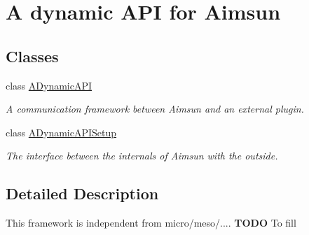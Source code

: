 \hypertarget{group__ADynamicAPI}{}\section{A dynamic A\+PI for Aimsun}
\label{group__ADynamicAPI}
\subsection*{Classes}
\begin{DoxyCompactItemize}
\item 
class \hyperlink{classADynamicAPI}{A\+Dynamic\+A\+PI}
\begin{DoxyCompactList}\small\item\em A communication framework between Aimsun and an external plugin. \end{DoxyCompactList}\item 
class \hyperlink{classADynamicAPISetup}{A\+Dynamic\+A\+P\+I\+Setup}
\begin{DoxyCompactList}\small\item\em The interface between the internals of Aimsun with the outside. \end{DoxyCompactList}\end{DoxyCompactItemize}


\subsection{Detailed Description}
This framework is independent from micro/meso/.... {\bfseries T\+O\+DO} To fill 